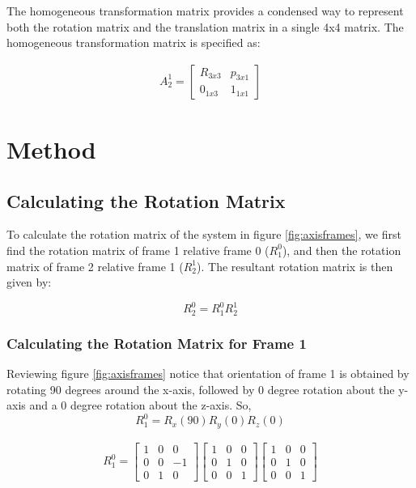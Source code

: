 \documentclass[a4paper, titlepage]{article}
\begin{document}
The homogeneous transformation matrix provides a condensed way to represent both the rotation matrix and the translation matrix in a single 4x4 matrix.
The homogeneous transformation matrix is specified as\citep[p.15]{ho90}:

\begin{equation}
\begin{split}
A^1_{2}= 
\begin{bmatrix}
R_{3x3} & p_{3x1} \\  
0_{1x3} &  1_{1x1}
\end{bmatrix}
\end{split}
\end{equation}



\section{Method}

\subsection{Calculating the Rotation Matrix}
To calculate the rotation matrix of the system in figure \ref{fig:axisframes}, we first find the rotation matrix of frame 1 relative frame 0 ($R^0_{1}$), and then the rotation matrix of frame 2 relative frame 1 ($R^1_{2}$).  The resultant rotation matrix is then given by:

\begin{equation}
R^0_{2} = R^0_{1}R^1_{2}
\end{equation}

\subsubsection{Calculating the Rotation Matrix for Frame 1}


Reviewing figure \ref{fig:axisframes} notice that orientation of frame 1 is obtained by rotating 90 degrees around the x-axis, followed by 0 degree rotation about the y-axis and a 0 degree rotation about the z-axis. So, 
\begin{equation}
R^0_{1} = R_{x}(90)R_{y}(0)R_{z}(0)
\end{equation}

\begin{equation}
\begin{split}
R^0_{1} = 
\begin{bmatrix}
1 & 0 & 0 \\ 0 & 0 & -1 \\ 0 & 1 & 0 
\end{bmatrix}
\begin{bmatrix}
1 & 0 & 0 \\ 0 & 1 & 0 \\ 0 & 0 & 1 
\end{bmatrix}
\begin{bmatrix}
1 & 0 & 0 \\ 0 & 1 & 0 \\ 0 & 0 & 1 
\end{bmatrix}
\end{split}
\end{equation}
\end{document}
